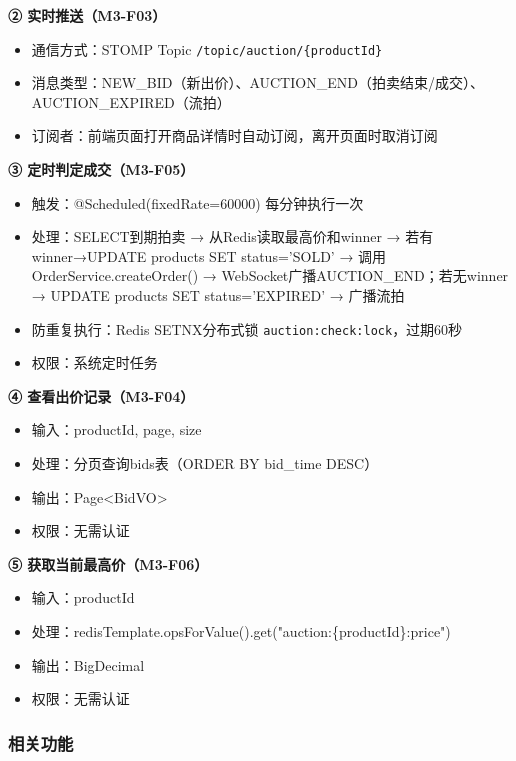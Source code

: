 \documentclass[12pt,a4paper]{ctexart}
\numberwithin{figure}{section}
\numberwithin{table}{section}
\begin{document}
\textbf{② 实时推送（M3-F03）}

\begin{itemize}
    \item 通信方式：STOMP Topic \verb|/topic/auction/{productId}|
    \item 消息类型：NEW\_BID（新出价）、AUCTION\_END（拍卖结束/成交）、AUCTION\_EXPIRED（流拍）
    \item 订阅者：前端页面打开商品详情时自动订阅，离开页面时取消订阅
\end{itemize}

\textbf{③ 定时判定成交（M3-F05）}

\begin{itemize}
    \item 触发：@Scheduled(fixedRate=60000) 每分钟执行一次
    \item 处理：SELECT到期拍卖 → 从Redis读取最高价和winner → 若有winner→UPDATE products SET status='SOLD' → 调用OrderService.createOrder() → WebSocket广播AUCTION\_END；若无winner → UPDATE products SET status='EXPIRED' → 广播流拍
    \item 防重复执行：Redis SETNX分布式锁 \verb|auction:check:lock|，过期60秒
    \item 权限：系统定时任务
\end{itemize}

\textbf{④ 查看出价记录（M3-F04）}

\begin{itemize}
    \item 输入：productId, page, size
    \item 处理：分页查询bids表（ORDER BY bid\_time DESC）
    \item 输出：Page<BidVO>
    \item 权限：无需认证
\end{itemize}

\textbf{⑤ 获取当前最高价（M3-F06）}

\begin{itemize}
    \item 输入：productId
    \item 处理：redisTemplate.opsForValue().get("auction:\{productId\}:price")
    \item 输出：BigDecimal
    \item 权限：无需认证
\end{itemize}

\subsubsection{相关功能}
\end{document}
